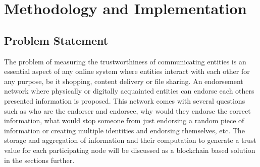 \chapter{Methodology and Implementation} \label{ch:method}

\section{Problem Statement}
The problem of measuring the trustworthiness of communicating entities is
an essential aspect of any online system where entities interact with 
each other for any purpose, be it shopping, content delivery or file sharing. 
An endorsement network where physically or digitally acquainted entities can
endorse each others presented information is proposed. This network comes with
several questions such as who are the endorser and endorsee, why would they 
endorse the correct information, what would stop someone from just endorsing 
a random piece of information or creating multiple identities and endorsing 
themselves, etc. The storage and aggregation of information and their 
computation to generate a trust value for each participating node will be 
discussed as a blockchain based solution in the sections further. 



